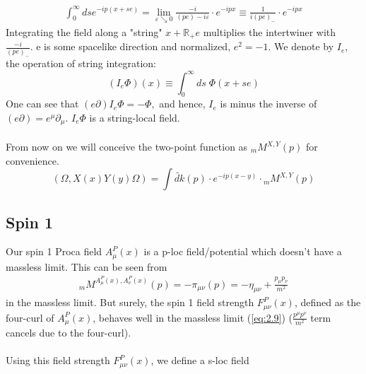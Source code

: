 \documentclass[12pt,a4paper]{article}
\numberwithin{equation}{section}
\begin{document}
\begin{align*}
\int_{0}^{\infty} d s e^{-i p(x+s e)}=\lim _{\varepsilon \searrow 0} \frac{-i}{(p e)-i \varepsilon} \cdot e^{-i p x} \equiv \frac{1}{i(p e)_{-}} \cdot e^{-i p x}
\end{align*}
Integrating the field along a "string" $x+\mathbb{R}_{+} e$ multiplies the intertwiner with $\frac{-i}{(p e)_{-}}$. e is some spacelike direction and normalized, $e^{2}=-1$. We denote by $I_{e}$, the operation of string integration:
$$
\left(I_{e} \Phi\right)(x) \equiv \int_{0}^{\infty} d s\; \Phi(x+s e)
$$
One can see that $(e \partial) I_{e} \Phi=-\Phi,$ and hence, $I_{e}$ is minus the inverse of $(e \partial)=e^{\mu} \partial_{\mu}$.
$I_{e} \Phi$ is a string-local field.\\\\
From now on we will conceive the two-point function as ${}_m M^{X,Y}(p)$ for convenience. 
\begin{equation}
(\Omega, X(x) Y(y) \Omega)=\int \widetilde{d k}(p) \cdot e^{-i p(x-y)} \cdot {}_m M^{X, Y}(p)
\end{equation} 

\subsection{Spin 1}
Our spin 1 Proca field $A^P_\mu(x)$ is a p-loc field/potential which doesn't have a massless limit. This can be seen from 
\begin{align*}
{ }_{m} M^{A^P_{\mu}(x), A^P_{\nu}(x)}(p)=-\pi_{\mu\nu}(p)=-\eta_{\mu\nu}+\frac{p_\mu p_\nu}{m^2}
\end{align*} in the massless limit. But surely, the spin 1 field strength $F^P_{\mu\nu}(x)$, defined as the four-curl of $A^P_\mu(x)$, behaves well in the massless limit (\ref{eq:2.9}) ($\frac{p^\mu p^\nu}{m^2}$ term cancels due to the four-curl).\\\\
Using this field strength $F^P_{\mu\nu}(x)$, we define a s-loc field 
\end{document}
